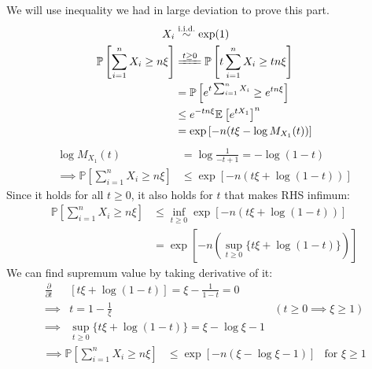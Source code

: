 \documentclass{article}
\numberwithin{equation}{section}
\newcommand{\EX}[2][]{\mathbb{E}_{#1}\left[#2\right]}%
\newcommand{\prob}[1]{\mathbb{P}\left[#1\right]}%
\begin{document}
\subsection{}
We will use inequality we had in large deviation to prove this part.
\begin{align}
X_i &\stackrel{\text{i.i.d.}}{\sim} \exp(1)\\
\prob{\sum_{i=1}^n X_i \ge n\xi} &\xlongequal{t\ge 0} \prob{t\sum_{i=1}^n X_i \ge tn\xi}\\
&=\prob{e^{t\sum_{i=1}^n X_i} \ge e^{tn\xi}}\\
&\le e^{-tn\xi} \EX{e^{tX_1}}^n\\
&= \exp\left[-n(t\xi - \log M_{X_1}(t)) \right]
\label{eq:chenoff-bound}
\end{align} 
\begin{align}
\log M_{X_1}(t) &= \log \frac{1}{-t + 1} = -\log (1-t)\\
\implies \prob{\sum_{i=1}^n X_i \ge n\xi} &\le \exp\left[-n(t\xi + \log (1-t)) \right]
\end{align}
Since it holds for all \(t\ge 0\), it also holds for \(t\) that makes RHS infimum:
\begin{align}
\prob{\sum_{i=1}^n X_i \ge n\xi} &\le \inf_{t\ge 0} \exp\left[-n(t\xi + \log (1-t)) \right]\\
&= \exp\left[-n(\sup_{t\ge 0}\{t\xi + \log (1-t)\}) \right]
\end{align}
We can find supremum value by taking derivative of it:
\begin{align}
\frac{\partial}{\partial t} &\left[ t\xi + \log (1-t) \right] = \xi - \frac{1}{1-t}=0\\
\implies &t = 1 - \frac{1}{\xi} & (t\ge 0 \implies \xi \ge 1)\\
\implies &\sup_{t\ge 0}\{t\xi + \log (1-t)\} = \xi - \log \xi - 1
\end{align}
\begin{align}
\implies \prob{\sum_{i=1}^n X_i \ge n\xi} &\le \exp\left[-n(\xi - \log \xi - 1) \right] & \text{for } \xi \ge 1
\end{align}
\end{document}
